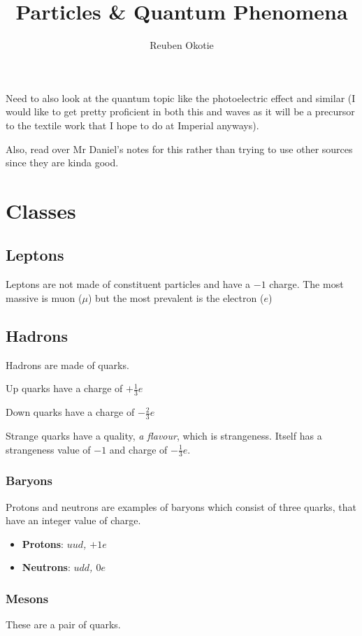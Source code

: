 \documentclass{article}
\title{Particles \& Quantum Phenomena}
\author{Reuben Okotie}
\begin{document}
\maketitle

Need to also look at the quantum topic like the photoelectric effect and similar (I would like to get pretty proficient in both this and waves as it will be a precursor to the textile work that I hope to do at Imperial anyways).

Also, read over Mr Daniel's notes for this rather than trying to use other sources since they are kinda good. 

\section{Classes}
\subsection{Leptons}
Leptons are not made of constituent particles and have a $-1$ charge. The most massive is muon ($\mu$) but the most prevalent is the electron ($e$)

\subsection{Hadrons}
Hadrons are made of quarks. 

Up quarks have a charge of $+\frac{1}{3}e$

Down quarks have a charge of $-\frac{2}{3}e$

Strange quarks have a quality, \textit{a flavour}, which is strangeness. Itself has a strangeness value of $-1$ and charge of $-\frac{1}{3}e$.

\subsubsection{Baryons}
Protons and neutrons are examples of baryons which consist of three quarks, that have an integer value of charge. %
\begin{itemize}
    \item \textbf{Protons}: \textit{$uud$, $+1e$}
    \item \textbf{Neutrons}: \textit{$udd$, $0e$}
\end{itemize}

\subsubsection{Mesons}
These are a pair of quarks.
\end{document}
